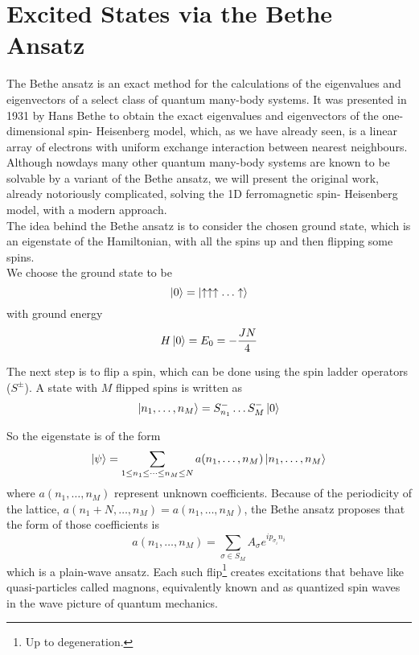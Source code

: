 \documentclass[../fstates.tex,../../main.tex]{subfiles}
\begin{document}
\section{Excited States via the Bethe Ansatz}

The Bethe ansatz is an exact method for the calculations of the eigenvalues and eigenvectors of a select class of quantum many-body systems. It was presented in 1931 by Hans Bethe\cite{bethe} to obtain the exact eigenvalues and eigenvectors of the one-dimensional spin- Heisenberg model, which, as we have already seen, is a linear array of electrons with uniform exchange interaction between nearest neighbours. Although nowdays many other quantum many-body systems are known to be solvable by a variant of the Bethe ansatz, we will present the original work, already notoriously complicated, solving the 1D ferromagnetic spin- Heisenberg model, with a modern approach.\\

The idea behind the Bethe ansatz is to consider the chosen ground state, which is an eigenstate of the Hamiltonian, with all the spins up and then flipping some spins.\\

We choose the ground state to be
\begin{equation}
    \ket{0}=\ket{\uparrow\uparrow\uparrow\ldots\uparrow}
\end{equation}
with ground energy
\begin{equation}
    H\ket{0}=E_{0}=-\frac{JN}{4}
\end{equation}

The next step is to flip a spin, which can be done using the spin ladder operators ($S^{\pm}$). A state with $M$ flipped spins is written as
\begin{equation}
    \ket{n_{1},\dots, n_{M}}=S_{n_{1}}^{-}\dots S_{M}^{-}\ket{0}
\end{equation}

So the eigenstate is of the form
\begin{equation}
    \ket{\psi}=\sum_{1\le n_{1}\le\dots\le n_{M}\le N} a(n_{1},\dots,n_{M})\ket{n_{1},\dots, n_{M}}
\end{equation}
where $a(n_{1},\dots,n_{M})$ represent unknown coefficients. Because of the periodicity of the lattice, $a(n_{1}+N,\dots,n_{M})=a(n_{1},\dots,n_{M})$, the Bethe ansatz proposes that the form of those coefficients is
\begin{equation}
    a(n_{1},\dots,n_{M})=\sum_{\sigma\in S_{M}} A_{\sigma}e^{ip_{\sigma_{i}}n_{i}}
\end{equation}
which is a plain-wave ansatz. Each such flip\footnote{Up to degeneration.} creates excitations that behave like quasi-particles called magnons, equivalently known and as quantized spin waves in the wave picture of quantum mechanics. 
\end{document}
